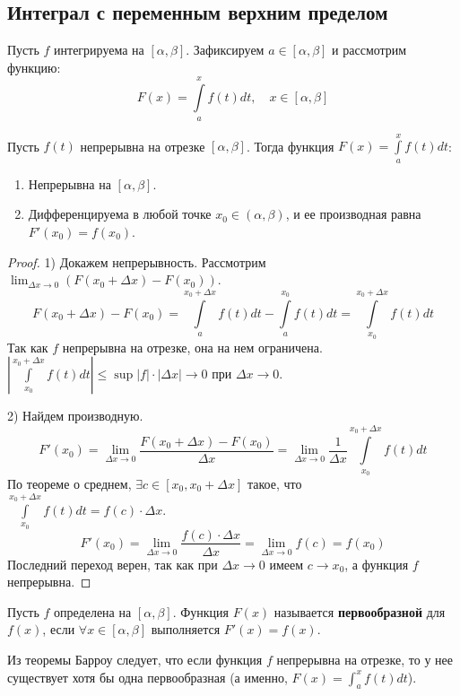 \documentclass[12pt]{article}
\newcommand{\dint}{\displaystyle\int}
\begin{document}
	\subsection{Интеграл с переменным верхним пределом}
	
	Пусть $f$ интегрируема на $[\alpha, \beta]$. Зафиксируем $a \in [\alpha, \beta]$ и рассмотрим функцию:
	$$ F(x) = \dint\limits_a^x f(t) dt, \quad x \in [\alpha, \beta] $$
	
	\begin{theorem}
		Пусть $f(t)$ непрерывна на отрезке $[\alpha, \beta]$. Тогда функция $F(x) = \dint\limits_a^x f(t) dt$:
		\begin{enumerate}
			\item Непрерывна на $[\alpha, \beta]$.
			\item Дифференцируема в любой точке $x_0 \in (\alpha, \beta)$, и ее производная равна $F'(x_0) = f(x_0)$.
		\end{enumerate}
	\end{theorem}
	\begin{proof}
		1) Докажем непрерывность. Рассмотрим $\lim_{\Delta x \to 0} (F(x_0 + \Delta x) - F(x_0))$.
		$$ F(x_0 + \Delta x) - F(x_0) = \dint\limits_a^{x_0 + \Delta x} f(t) dt - \dint\limits_a^{x_0} f(t) dt = \dint\limits_{x_0}^{x_0 + \Delta x} f(t) dt $$
		Так как $f$ непрерывна на отрезке, она на нем ограничена. $|\dint\limits_{x_0}^{x_0 + \Delta x} f(t) dt| \leqslant \sup |f| \cdot |\Delta x| \to 0$ при $\Delta x \to 0$.
		
		2) Найдем производную.
		$$ F'(x_0) = \lim_{\Delta x \to 0} \frac{F(x_0 + \Delta x) - F(x_0)}{\Delta x} = \lim_{\Delta x \to 0} \frac{1}{\Delta x} \dint\limits_{x_0}^{x_0 + \Delta x} f(t) dt $$
		По теореме о среднем, $\exists c \in [x_0, x_0 + \Delta x]$ такое, что $\dint\limits_{x_0}^{x_0 + \Delta x} f(t) dt = f(c) \cdot \Delta x$.
		$$ F'(x_0) = \lim_{\Delta x \to 0} \frac{f(c) \cdot \Delta x}{\Delta x} = \lim_{\Delta x \to 0} f(c) = f(x_0) $$
		Последний переход верен, так как при $\Delta x \to 0$ имеем $c \to x_0$, а функция $f$ непрерывна.
	\end{proof}
	
	\begin{definition}[Первообразная]
		Пусть $f$ определена на $[\alpha, \beta]$. Функция $F(x)$ называется \textbf{первообразной} для $f(x)$, если $\forall x \in [\alpha, \beta]$ выполняется $F'(x) = f(x)$.
	\end{definition}
	
	\begin{statement}
		Из теоремы Барроу следует, что если функция $f$ непрерывна на отрезке, то у нее существует хотя бы одна первообразная (а именно, $F(x) = \dint_a^x f(t)dt$).
	\end{statement}
	
\end{document}
